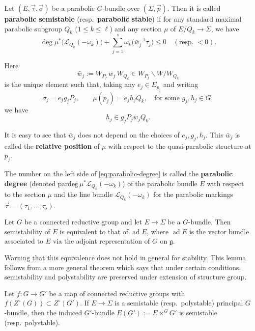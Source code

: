 \documentclass[12pt]{article}
\begin{document}
\begin{definition}
Let \((E,\vec\tau,\vec\sigma)\) be a parabolic \(G\)-bundle over \((\Sigma,\vec p)\).
Then it is called \textbf{parabolic semistable} (resp.\ \textbf{parabolic stable})
if for any standard maximal parabolic subgroup \(Q_k\) (\(1\le k\le \ell\)) and any section
\(\mu\) of \(E/Q_k \to \Sigma\), we have
\begin{equation}\label{eq:parabolic-degree}
\deg \mu^*\bigl(\mathcal L_{Q_k}(-\omega_k)\bigr)
+
\sum_{j=1}^s \omega_k\bigl(\bar w_j^{-1}\tau_j\bigr)
\le 0
\quad (\text{resp.\ } < 0).
\end{equation}

Here
\[
\bar w_j := W_{P_j}\, w_j\, W_{Q_k} \in W_{P_j}\backslash W / W_{Q_k}
\]
is the unique element such that, taking any \(e_j\in E_{p_j}\) and writing
\[
\sigma_j = e_j g_j P_j,
\qquad
\mu(p_j)= e_j h_j Q_k,
\quad \text{for some } g_j,h_j\in G,
\]
we have
\begin{equation}
h_j \in g_j P_j w_j Q_k.
\end{equation}

It is easy to see that \(\bar w_j\) does not depend on the choices of \(e_j,g_j,h_j\).
This \(\bar w_j\) is called the \textbf{relative position} of \(\mu\) with respect to the
quasi-parabolic structure at \(p_j\).

The number on the left side of \eqref{eq:parabolic-degree} is called the \textbf{parabolic degree}
(denoted \(\mathrm{pardeg}\,\mu^*\mathcal L_{Q_k}(-\omega_k)\))
of the parabolic bundle \(E\) with respect to the section \(\mu\)
and the line bundle \(\mathcal L_{Q_k}(-\omega_k)\)
for the parabolic markings \(\vec\tau=(\tau_1,\dots,\tau_s)\).
\end{definition}

\begin{lemma}
Let \(G\) be a connected reductive group and let \(E\to \Sigma\) be a \(G\)-bundle. Then semistability of \(E\) is equivalent to that of \(\operatorname{ad}E\), where \(\operatorname{ad}E\) is the vector bundle associated to \(E\) via the adjoint representation of \(G\) on \(\mathfrak g\).
\end{lemma}
Warning that this equivalence does not hold in general for stability. This lemma follows from a more general theorem which says that under certain conditions, semistability and polystability are preserved under extension of structure group.

\begin{theorem}
Let \(f \colon G \to G'\) be a map of connected reductive groups with
\(f(Z^\circ(G)) \subset Z^\circ(G')\).
If \(E \to \Sigma\) is a semistable (resp.\ polystable) principal \(G\)-bundle, then the induced
\(G'\)-bundle \(E(G') := E \times^G G'\) is semistable (resp.\ polystable).
\end{theorem}
\end{document}
